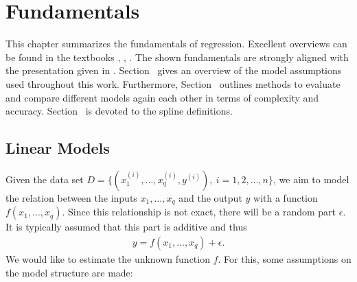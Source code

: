 
\chapter{Fundamentals} \label{chap:fundamentals}

This chapter summarizes the fundamentals of regression. Excellent overviews can be found in the textbooks \cite{wood2017generalized}, \cite{fahrmeir2007regression}, \cite{friedman2001elements}. The shown fundamentals are strongly aligned with the presentation given in \cite{fahrmeir2007regression}. Section~ gives an overview of the model assumptions used throughout this work. Furthermore, Section~ outlines methods to evaluate and compare different models again each other in terms of complexity and accuracy. Section~ is devoted to the  spline definitions.

\section{Linear Models} \label{sec:LinModel}

Given the data set $D = \{ (x^{(i)}_1, \dots, x^{(i)}_q, y^{(i)}), \ i=1,2, \dots, n\}$, we aim to model the relation between the inputs $x_1, \dots, x_q$ and the output $y$ with a function $f(x_1, \dots, x_q)$. Since this relationship is not exact, there will be a random part $\epsilon$. It is typically assumed that this part is additive and thus  
\begin{align} \label{eq:model-structure}
	y = f(x_{1}, \dots, x_{q}) + \epsilon.
\end{align}
%
We would like to estimate the unknown function $f$. For this, some assumptions on the model structure are made:

